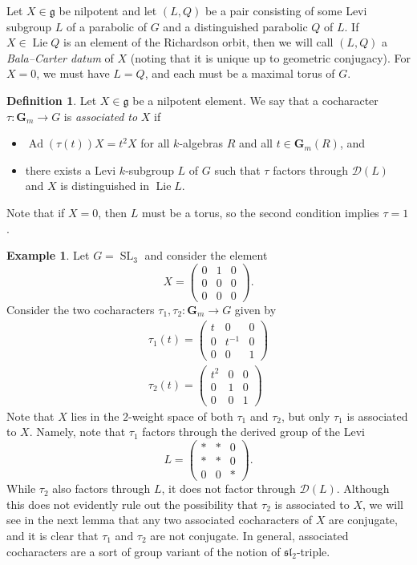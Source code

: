 \documentclass[11pt,reqno]{amsart}
\theoremstyle{definition}
\newtheorem{definition}[theorem]{Definition}
\newtheorem{example}[theorem]{Example}
\newcommand{\bG}{{\mathbf G}}
\newcommand{\sD}{{\mathscr D}}
\newcommand{\fg}{\mathfrak{g}}
\DeclareMathOperator{\Ad}{Ad}
\DeclareMathOperator{\Lie}{Lie}
\DeclareMathOperator{\SL}{SL}
\begin{document}
Let $X \in \fg$ be nilpotent and let $(L, Q)$ be a pair consisting of some Levi subgroup $L$ of a parabolic of $G$ and a distinguished parabolic $Q$ of $L$. If $X \in \Lie Q$ is an element of the Richardson orbit, then we will call $(L, Q)$ a \textit{Bala--Carter datum} of $X$ (noting that it is unique up to geometric conjugacy). For $X = 0$, we must have $L = Q$, and each must be a maximal torus of $G$.

\begin{definition}\label{definition:associated-cocharacters}
Let $X \in \fg$ be a nilpotent element. We say that a cocharacter $\tau: \bG_m \to G$ is \textit{associated to} $X$ if
\begin{itemize}
    \item $\Ad(\tau(t))X = t^2 X$ for all $k$-algebras $R$ and all $t \in \bG_m(R)$, and
    \item there exists a Levi $k$-subgroup $L$ of $G$ such that $\tau$ factors through $\sD(L)$ and $X$ is distinguished in $\Lie L$.
\end{itemize}
\end{definition}

Note that if $X = 0$, then $L$ must be a torus, so the second condition implies $\tau = 1$. 

\begin{example}
Let $G = \SL_3$ and consider the element
\[
X = \begin{pmatrix} 0 & 1 & 0 \\ 0 & 0 & 0 \\ 0 & 0 & 0 \end{pmatrix}.
\]
Consider the two cocharacters $\tau_1, \tau_2: \bG_m \to G$ given by
\begin{gather*}
\tau_1(t) = \begin{pmatrix} t & 0 & 0 \\ 0 & t^{-1} & 0 \\ 0 & 0 & 1 \end{pmatrix} \\
\tau_2(t) = \begin{pmatrix} t^2 & 0 & 0 \\ 0 & 1 & 0 \\ 0 & 0 & 1 \end{pmatrix}
\end{gather*}
Note that $X$ lies in the $2$-weight space of both $\tau_1$ and $\tau_2$, but only $\tau_1$ is associated to $X$. Namely, note that $\tau_1$ factors through the derived group of the Levi
\[
L = \begin{pmatrix} * & * & 0 \\ * & * & 0 \\ 0 & 0 & * \end{pmatrix}.
\]
While $\tau_2$ also factors through $L$, it does not factor through $\sD(L)$. Although this does not evidently rule out the possibility that $\tau_2$ is associated to $X$, we will see in the next lemma that any two associated cocharacters of $X$ are conjugate, and it is clear that $\tau_1$ and $\tau_2$ are not conjugate. In general, associated cocharacters are a sort of group variant of the notion of $\mathfrak{sl}_2$-triple.
\end{example}
\end{document}
